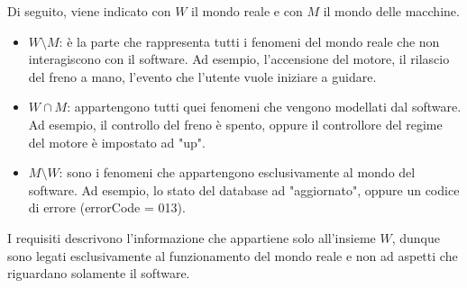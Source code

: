 Di seguito, viene indicato con $W$ il mondo reale e con $M$ il mondo delle macchine.
\begin{itemize}
	\item $W \setminus M$: è la parte che rappresenta tutti i fenomeni del mondo reale che non interagiscono con il software. Ad esempio, l'accensione del motore, il rilascio del freno a mano, l'evento che l'utente vuole iniziare a guidare.
	\item $W \cap M$: appartengono tutti quei fenomeni che vengono modellati dal software. Ad esempio, il controllo del freno è spento, oppure il controllore del regime del motore è impostato ad "up".
	\item $M \setminus W$: sono i fenomeni che appartengono esclusivamente al mondo del software. Ad esempio, lo stato del database ad "aggiornato", oppure un codice di errore (errorCode = 013).
\end{itemize}
I requisiti descrivono l'informazione che appartiene solo all'insieme $W$, dunque sono legati esclusivamente al funzionamento del mondo reale e non ad aspetti che riguardano solamente il software.

